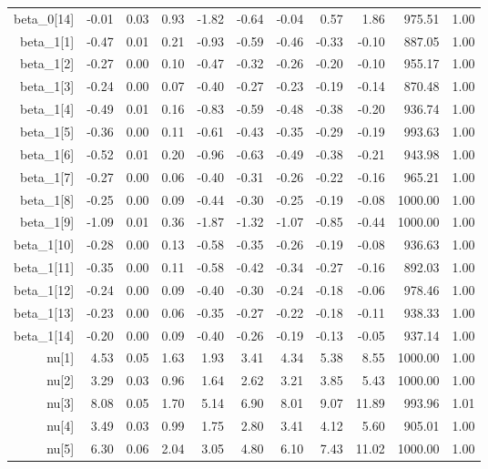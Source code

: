 \begin{longtable}{rrrrrrrrrrr}
  beta_0[14] & -0.01 & 0.03 & 0.93 & -1.82 & -0.64 & -0.04 & 0.57 & 1.86 & 975.51 & 1.00 \\ 
  beta_1[1] & -0.47 & 0.01 & 0.21 & -0.93 & -0.59 & -0.46 & -0.33 & -0.10 & 887.05 & 1.00 \\ 
  beta_1[2] & -0.27 & 0.00 & 0.10 & -0.47 & -0.32 & -0.26 & -0.20 & -0.10 & 955.17 & 1.00 \\ 
  beta_1[3] & -0.24 & 0.00 & 0.07 & -0.40 & -0.27 & -0.23 & -0.19 & -0.14 & 870.48 & 1.00 \\ 
  beta_1[4] & -0.49 & 0.01 & 0.16 & -0.83 & -0.59 & -0.48 & -0.38 & -0.20 & 936.74 & 1.00 \\ 
  beta_1[5] & -0.36 & 0.00 & 0.11 & -0.61 & -0.43 & -0.35 & -0.29 & -0.19 & 993.63 & 1.00 \\ 
  beta_1[6] & -0.52 & 0.01 & 0.20 & -0.96 & -0.63 & -0.49 & -0.38 & -0.21 & 943.98 & 1.00 \\ 
  beta_1[7] & -0.27 & 0.00 & 0.06 & -0.40 & -0.31 & -0.26 & -0.22 & -0.16 & 965.21 & 1.00 \\ 
  beta_1[8] & -0.25 & 0.00 & 0.09 & -0.44 & -0.30 & -0.25 & -0.19 & -0.08 & 1000.00 & 1.00 \\ 
  beta_1[9] & -1.09 & 0.01 & 0.36 & -1.87 & -1.32 & -1.07 & -0.85 & -0.44 & 1000.00 & 1.00 \\ 
  beta_1[10] & -0.28 & 0.00 & 0.13 & -0.58 & -0.35 & -0.26 & -0.19 & -0.08 & 936.63 & 1.00 \\ 
  beta_1[11] & -0.35 & 0.00 & 0.11 & -0.58 & -0.42 & -0.34 & -0.27 & -0.16 & 892.03 & 1.00 \\ 
  beta_1[12] & -0.24 & 0.00 & 0.09 & -0.40 & -0.30 & -0.24 & -0.18 & -0.06 & 978.46 & 1.00 \\ 
  beta_1[13] & -0.23 & 0.00 & 0.06 & -0.35 & -0.27 & -0.22 & -0.18 & -0.11 & 938.33 & 1.00 \\ 
  beta_1[14] & -0.20 & 0.00 & 0.09 & -0.40 & -0.26 & -0.19 & -0.13 & -0.05 & 937.14 & 1.00 \\ 
  nu[1] & 4.53 & 0.05 & 1.63 & 1.93 & 3.41 & 4.34 & 5.38 & 8.55 & 1000.00 & 1.00 \\ 
  nu[2] & 3.29 & 0.03 & 0.96 & 1.64 & 2.62 & 3.21 & 3.85 & 5.43 & 1000.00 & 1.00 \\ 
  nu[3] & 8.08 & 0.05 & 1.70 & 5.14 & 6.90 & 8.01 & 9.07 & 11.89 & 993.96 & 1.01 \\ 
  nu[4] & 3.49 & 0.03 & 0.99 & 1.75 & 2.80 & 3.41 & 4.12 & 5.60 & 905.01 & 1.00 \\ 
  nu[5] & 6.30 & 0.06 & 2.04 & 3.05 & 4.80 & 6.10 & 7.43 & 11.02 & 1000.00 & 1.00 \\ 

\end{longtable}
